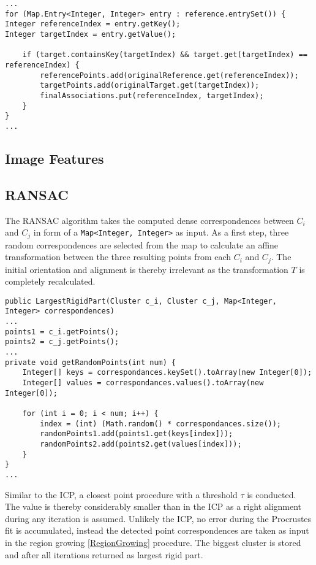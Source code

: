 \begin{lstlisting}
...
for (Map.Entry<Integer, Integer> entry : reference.entrySet()) {
Integer referenceIndex = entry.getKey();
Integer targetIndex = entry.getValue();

	if (target.containsKey(targetIndex) && target.get(targetIndex) == referenceIndex) {
		referencePoints.add(originalReference.get(referenceIndex));
		targetPoints.add(originalTarget.get(targetIndex));
		finalAssociations.put(referenceIndex, targetIndex);
	}
}
...
\end{lstlisting}

\subsection{Image Features}
%
%
\subsection{RANSAC}
\label{RANSAC}
The RANSAC algorithm takes the computed dense correspondences between $C_i$ and $C_j$ in form of a \texttt{Map<Integer, Integer>} as input. As a first step, three random correspondences are selected from the map to calculate an affine transformation between the three resulting points from each $C_i$ and $C_j$. The initial orientation and alignment is thereby irrelevant as the transformation $T$ is completely recalculated.

\begin{lstlisting}
public LargestRigidPart(Cluster c_i, Cluster c_j, Map<Integer, Integer> correspondences)
...
points1 = c_i.getPoints();
points2 = c_j.getPoints();
...
private void getRandomPoints(int num) {
	Integer[] keys = correspondances.keySet().toArray(new Integer[0]);
	Integer[] values = correspondances.values().toArray(new Integer[0]);

	for (int i = 0; i < num; i++) {
		index = (int) (Math.random() * correspondances.size());
		randomPoints1.add(points1.get(keys[index]));
		randomPoints2.add(points2.get(values[index]));
	}
}
...
\end{lstlisting}

Similar to the ICP, a closest point procedure with a threshold $\tau$ is conducted. The value is thereby considerably smaller than in the ICP as a right alignment during any iteration is assumed. Unlikely the ICP, no error during the Procrustes fit is accumulated, instead the detected point correspondences are taken as input in the region growing \ref{RegionGrowing} procedure. The biggest cluster is stored and after all iterations returned as largest rigid part.

